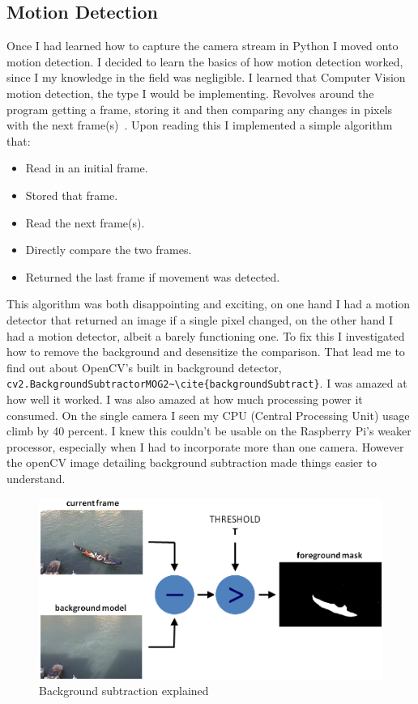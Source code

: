  \subsection{Motion Detection}
 Once I had learned how to capture the camera stream in Python I moved onto motion detection. I decided to learn the basics of how motion detection worked, since I my knowledge in the field was negligible. I learned that Computer Vision motion detection, the type I would be implementing. Revolves around the program getting a frame, storing it and then comparing any changes in pixels with the next frame(s)~\cite{howMotion}. Upon reading this I implemented a simple algorithm that:
 \begin{itemize}
 \item Read in an initial frame.
 \item Stored that frame.
 \item Read the next frame(s).
 \item Directly compare the two frames.
 \item Returned the last frame if movement was detected.
 \end{itemize}
 This algorithm was both disappointing and exciting, on one hand I had a motion detector that returned an image if a single pixel changed, on the other hand I had a motion detector, albeit a barely functioning one. To fix this I investigated how to remove the background and desensitize the comparison. That lead me to find out about OpenCV's built in background detector, \verb|cv2.BackgroundSubtractorMOG2~\cite{backgroundSubtract}|. I was amazed at how well it worked. I was also amazed at how much processing power it consumed. On the single camera I seen my CPU (Central Processing Unit) usage climb by 40 percent. I knew this couldn't be usable on the Raspberry Pi's weaker processor, especially when I had to incorporate more than one camera. However the openCV image detailing background subtraction made things easier to understand.
 \begin{figure}[!htbp] 
      \centering
     \includegraphics[scale=0.6]{img/backgroundSub.png}
      \caption{Background subtraction explained}
      \label{fig:my_label}
  \end{figure}    
